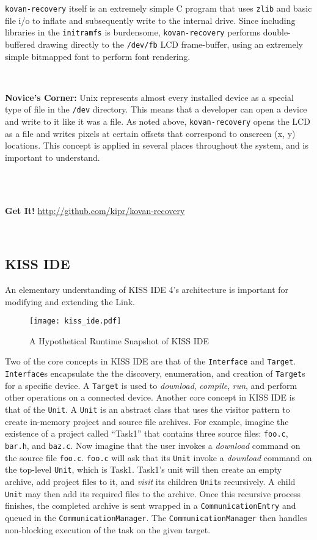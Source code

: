 \documentclass[12pt,letterpaper]{article}
\newcommand{\bcolorbox}[4]{\noindent \\ \fcolorbox{#1}{#2} {\parbox{\textwidth}{\vspace{.1em}\textbf{#3} #4\vspace{.1em}}} \\}
\newcommand{\novice}[1]{\bcolorbox{green}{Honeydew}{Novice's Corner:}{#1}}
\newcommand{\getit}[1]{\bcolorbox{Indigo}{Lavender}{Get It!}{#1}}
\begin{document}
	\texttt{kovan-recovery} itself is an extremely simple C program that uses \texttt{zlib} and basic file i/o to inflate and subsequently write
	to the internal drive. Since including libraries in the \texttt{initramfs} is burdensome, \texttt{kovan-recovery} performs double-buffered
	drawing directly to the \texttt{/dev/fb} LCD frame-buffer, using an extremely simple bitmapped font to perform font rendering.
	
	\novice{Unix represents almost every installed device as a special type of file in the \texttt{/dev} directory. This means that
	a developer can open a device and write to it like it was a file. As noted above, \texttt{kovan-recovery} opens the LCD as a file and
	writes pixels at certain offsets that correspond to onscreen (x, y) locations. This concept is applied in several places throughout the system, and is important to understand.}
	\getit{\url{http://github.com/kipr/kovan-recovery}}
	
	\subsection{KISS IDE}
	An elementary understanding of KISS IDE 4's architecture is important for modifying and extending the Link.
	
	\begin{figure}[H]
		\begin{center}
			\texttt{[image: kiss\_ide.pdf]}
			\caption{A Hypothetical Runtime Snapshot of KISS IDE}
		\end{center}
	\end{figure}
	
	Two of the core concepts in KISS IDE are that of the \texttt{Interface} and \texttt{Target}. \texttt{Interface}s encapsulate
	the the discovery, enumeration, and creation of \texttt{Target}s for a specific device. A \texttt{Target} is used to \emph{download},
	\emph{compile}, \emph{run}, and perform other operations on a connected device. Another core concept in KISS IDE is that of the
	\texttt{Unit}. A \texttt{Unit} is an abstract class that uses the visitor pattern to create in-memory project and source file archives.
	For example, imagine the existence of a project called ``Task1'' that contains three source files: \texttt{foo.c}, \texttt{bar.h}, and 
	\texttt{baz.c}. 
	Now imagine that the user invokes a \emph{download} command on the source file \texttt{foo.c}. \texttt{foo.c} will ask that its
	\texttt{Unit} invoke a \emph{download} command on the top-level \texttt{Unit}, which is Task1. Task1's unit will then create an empty archive,
	add project files to it, and \emph{visit} its children \texttt{Unit}s recursively. A child \texttt{Unit} may then add its required files
	to the archive. Once this recursive process finishes, the completed archive is sent wrapped in a \texttt{CommunicationEntry} and queued in
	the \texttt{CommunicationManager}. The \texttt{CommunicationManager} then handles non-blocking execution of the task on the given target.
	
\end{document}
